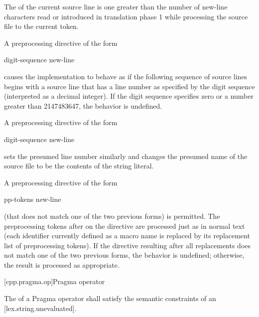 \documentclass{wg21}
\begin{document}
\pnum
The
of the current source line is one greater than
the number of new-line characters read or introduced
in translation phase 1
while processing the source file to the current token.

\pnum
A preprocessing directive of the form
\begin{ncsimplebnf}
     digit-sequence new-line
\end{ncsimplebnf}
causes the implementation to behave as if
the following sequence of source lines begins with a
source line that has a line number as specified
by the digit sequence (interpreted as a decimal integer).
If the digit sequence specifies zero
or a number greater than 2147483647,
the behavior is undefined.

\pnum
A preprocessing directive of the form

\begin{ncsimplebnf}
     digit-sequence  new-line
\end{ncsimplebnf}

sets the presumed line number similarly and changes the
presumed name of the source file to be the contents
of the  string literal.

\pnum
A preprocessing directive of the form

\begin{ncsimplebnf}
     pp-tokens new-line
\end{ncsimplebnf}

(that does not match one of the two previous forms)
is permitted.
The preprocessing tokens after
on the directive are processed just as in normal text
(each identifier currently defined as a macro name is replaced by its
replacement list of preprocessing tokens).
If the directive resulting after all replacements does not match
one of the two previous forms, the behavior is undefined;
otherwise, the result is processed as appropriate.

[cpp.pragma.op]{Pragma operator}%
%

\begin{addedblock}
The  of a Pragma operator shall satisfy the semantic constraints of an  [lex.string.unevaluated].
\end{addedblock}
\end{document}
